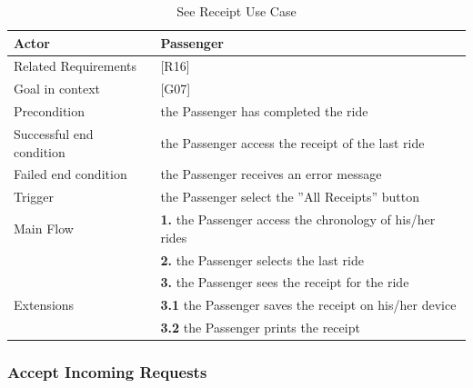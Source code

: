 \begin{table}[htbp]
\begin{center}
\begin{tabular}[t]{p{}p{}}

\hline
Actor & Passenger \\
\hline
Related Requirements & [R16] \\
\hline
Goal in context & [G07] \\
\hline
Precondition & the Passenger has completed the ride \\
\hline
Successful end condition & the Passenger access the receipt of the last ride \\
\hline
Failed end condition & the Passenger receives an error message  \\
\hline
Trigger & the Passenger select the ''All Receipts'' button \\
\hline
Main Flow & \textbf{1.} the Passenger access the chronology of his/her rides \\
& \textbf{2.} the Passenger selects the last ride \\
& \textbf{3.} the Passenger sees the receipt for the ride \\
\hline
Extensions & \textbf{3.1} the Passenger saves the receipt on his/her device \\
& \textbf{3.2} the Passenger prints the receipt \\
\hline

\end{tabular}
\end{center}
\caption{See Receipt Use Case}
\end{table}
\clearpage

\subsubsection{Accept Incoming Requests}

